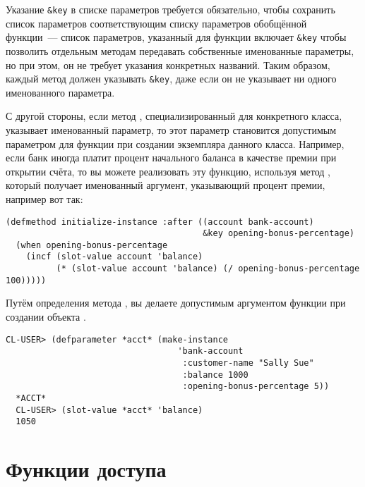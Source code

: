 Указание \lstinline!&key! в списке параметров требуется обязательно, чтобы сохранить
список параметров соответствующим списку параметров обобщённой функции~--- список
параметров, указанный для функции  включает \lstinline!&key!
чтобы позволить отдельным методам передавать собственные именованные параметры, но при
этом, он не требует указания конкретных названий.  Таким образом, каждый метод должен
указывать \lstinline!&key!, даже если он не указывает ни одного именованного параметра.

С другой стороны, если метод , специализированный для
конкретного класса, указывает именованный параметр, то этот параметр становится допустимым
параметром для функции  при создании экземпляра данного класса.
Например, если банк иногда платит процент начального баланса в качестве премии при
открытии счёта, то вы можете реализовать эту функцию, используя метод
, который получает именованный аргумент, указывающий процент
премии, например вот так:

\begin{lstlisting}
(defmethod initialize-instance :after ((account bank-account)
                                       &key opening-bonus-percentage)
  (when opening-bonus-percentage
    (incf (slot-value account 'balance)
          (* (slot-value account 'balance) (/ opening-bonus-percentage 100)))))
\end{lstlisting}

Путём определения метода , вы делаете
 допустимым аргументом функции  при
создании объекта .

\begin{lstlisting}[style=lisprepl]
  CL-USER> (defparameter *acct* (make-instance
                                  'bank-account
                                   :customer-name "Sally Sue"
                                   :balance 1000
                                   :opening-bonus-percentage 5))
  *ACCT*
  CL-USER> (slot-value *acct* 'balance)
  1050
\end{lstlisting}

\section{Функции доступа}

